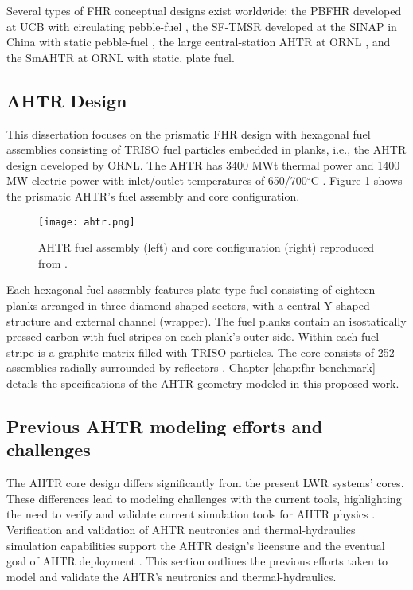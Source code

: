 Several types of \gls{FHR} conceptual designs exist worldwide: the \gls{PBFHR} 
developed at \gls{UCB} with circulating pebble-fuel 
\cite{scarlat_current_2014,krumwiede_three-dimensional_2013}, the \gls{SF-TMSR} 
developed at the \gls{SINAP} in China with static pebble-fuel \cite{liu_preliminary_2016}, 
the large central-station \gls{AHTR} at \gls{ORNL} \cite{holcomb_core_2011, varma_ahtr_2012}, 
and the \gls{SmAHTR} at ORNL \cite{greene_pre-conceptual_2010} with static, 
plate fuel. 

\subsection{\acrlong{AHTR} Design}
This dissertation focuses on the prismatic \gls{FHR} design with hexagonal fuel 
assemblies consisting of \gls{TRISO} fuel particles embedded in planks, i.e., 
the \gls{AHTR} design developed by ORNL. 
The \gls{AHTR} has 3400 MWt thermal power and 1400 MW electric power with
inlet/outlet temperatures of 650/700$^{\circ}$C \cite{varma_ahtr_2012}.  
Figure \ref{fig:ahtr} shows the prismatic AHTR's fuel assembly and core 
configuration.  
\begin{figure}[btp]
    \centering
    \texttt{[image: ahtr.png]} 
    \caption{\acrlong{AHTR} fuel assembly (left) and core configuration (right) 
    reproduced from \cite{ramey_monte_2018}.}
    \label{fig:ahtr}
\end{figure}
Each hexagonal fuel assembly features plate-type fuel consisting of eighteen 
planks arranged in three diamond-shaped sectors, with a central Y-shaped 
structure and external channel (wrapper).
The fuel planks contain an isostatically pressed carbon with fuel stripes 
on each plank's outer side.
Within each fuel stripe is a graphite matrix filled with \gls{TRISO} particles. 
The core consists of 252 assemblies radially surrounded by reflectors
\cite{ramey_monte_2018}. 
Chapter \ref{chap:fhr-benchmark} details the specifications of the AHTR geometry
modeled in this proposed work.

\subsection{Previous AHTR modeling efforts and challenges} 
\label{sec:previous_ahtr}
The \gls{AHTR} core design differs significantly from the present \gls{LWR} 
systems' cores. 
These differences lead to modeling challenges with the current tools, 
highlighting the need to verify and validate current simulation tools
for \gls{AHTR} physics \cite{ramey_monte_2018}. 
Verification and validation of \gls{AHTR} neutronics and thermal-hydraulics 
simulation capabilities support the \gls{AHTR} design's licensure and the
eventual goal of \gls{AHTR} deployment 
\cite{rahnema_phenomena_2019,rahnema_current_2015}.
This section outlines the previous efforts taken to model and validate 
the \gls{AHTR}'s neutronics and thermal-hydraulics. 

